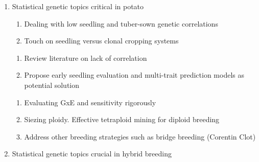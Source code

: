 \documentclass[
]{report}
\providecommand{\tightlist}{%
  \setlength{\itemsep}{0pt}\setlength{\parskip}{0pt}}\usepackage{longtable,booktabs,array}
\begin{document}
\begin{enumerate}
\def\labelenumi{\arabic{enumi}.}
\setcounter{enumi}{2}
\tightlist
\item
  Statistical genetic topics critical in potato

  \begin{enumerate}
  \def\labelenumii{\alph{enumii}.}
  \tightlist
  \item
    Dealing with low seedling and tuber-sown genetic correlations
  \item
    Touch on seedling versus clonal cropping systems
  \end{enumerate}

  \begin{enumerate}
  \def\labelenumii{\roman{enumii}.}
  \setcounter{enumii}{1}
  \tightlist
  \item
    Review literature on lack of correlation
  \item
    Propose early seedling evaluation and multi-trait prediction models
    as potential solution
  \end{enumerate}

  \begin{enumerate}
  \def\labelenumii{\alph{enumii}.}
  \setcounter{enumii}{1}
  \tightlist
  \item
    Evaluating GxE and sensitivity rigorously
  \item
    Siezing ploidy. Effective tetraploid mining for diploid breeding
  \item
    Address other breeding strategies such as bridge breeding (Corentin
    Clot)
  \end{enumerate}
\item
  Statistical genetic topics crucial in hybrid breeding
\end{enumerate}
\end{document}
